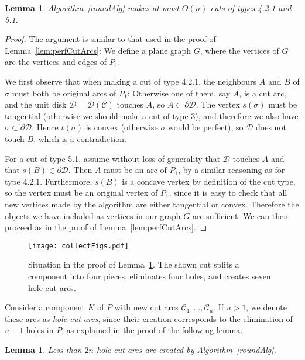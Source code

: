 \documentclass{article}
\newcommand{\PP}{P}
\newcommand{\KO}{K}
\newcommand{\se}{\sigma}
\newcommand{\cut}{\mathcal C}
\newcommand{\cutdisk}{\mathcal D}
\newcommand{\start}{s}
\newcommand{\terminal}{t}
\newcommand{\arcA}{A}
\newcommand{\arcB}{B}
\newtheorem{lemma}[theorem]{Lemma}
\begin{document}
\begin{lemma}\label{lem:nperfectcutarcs}
Algorithm~\ref{roundAlg} makes at most $O(n)$ cuts of types 4.2.1 and 5.1.
\end{lemma}

\begin{proof}
The argument is similar to that used in the proof of Lemma~\ref{lem:perfCutArcs}:
We define a plane graph $G$, where the vertices of $G$ are the vertices and edges of $\PP_1$.


We first observe that when making a cut of type 4.2.1, the neighbours $\arcA$ and $\arcB$ of $\sigma$ must both be original arcs of $\PP_1$:
Otherwise one of them, say $\arcA$, is a cut arc, and the unit disk $\cutdisk=\cutdisk(\cut)$ touches $\arcA$, so $\arcA\subset \partial\cutdisk$.
The vertex $\start(\se)$ must be tangential (otherwise we should make a cut of type 3), and therefore we also have $\se\subset\partial\cutdisk$.
Hence $\terminal(\se)$ is convex (otherwise $\se$ would be perfect), so $\cutdisk$ does not touch $\arcB$, which is a contradiction.

For a cut of type 5.1, assume without loss of generality that $\cutdisk$ touches $\arcA$ and that $\start(\arcB)\in \partial \cutdisk$.
Then $\arcA$ must be an arc of $\PP_1$, by a similar reasoning as for type 4.2.1.
Furthermore, $\start(\arcB)$ is a concave vertex by definition of the cut type, so the vertex must be an original vertex of $\PP_1$, since it is easy to check that all new vertices made by the algorithm are either tangential or convex.
Therefore the objects we have included as vertices in our graph $G$ are sufficient.
We can then proceed as in the proof of Lemma~\ref{lem:perfCutArcs}.
\end{proof}

\begin{figure}
\centering
\texttt{[image: collectFigs.pdf]}
\caption{Situation in the proof of Lemma~\ref{lemma:holearcs}.
The shown cut splits a component into four pieces, eliminates four holes, and creates seven hole cut arcs.}
\label{fig:lemma:holearcs}
\end{figure}

Consider a component $\KO$ of $\PP$ with new cut arcs $\cut_1,\ldots,\cut_u$.
If $u>1$, we denote these arcs as \emph{hole cut arcs}, since their creation corresponds to the elimination of $u-1$ holes in $\PP$, as explained in the proof of the following lemma.

\begin{lemma}\label{lemma:holearcs}
Less than $2n$ hole cut arcs are created by Algorithm~\ref{roundAlg}.
\end{lemma}
\end{document}
